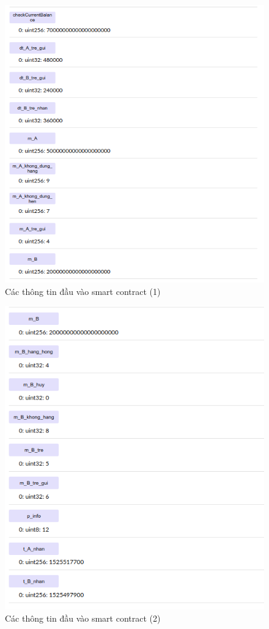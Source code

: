\begin{figure}[tph]
	\centering
	\includegraphics[width=14cm]{snapshot/10.png}
	\vspace{0.3cm}
	\caption{Các thông tin đầu vào smart contract (1)}
	\label{fig:fig10}
\end{figure}

\begin{figure}[tph]
	\centering
	\includegraphics[width=14cm]{snapshot/11.png}
	\vspace{0.3cm}
	\caption{Các thông tin đầu vào smart contract (2)}
	\label{fig:fig11}
\end{figure}

